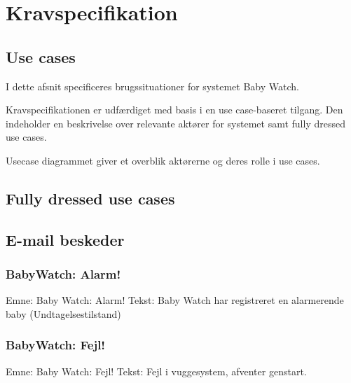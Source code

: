 \chapter{Kravspecifikation}


\section{Use cases}

I dette afsnit specificeres brugssituationer for systemet Baby Watch.

Kravspecifikationen er udfærdiget med basis i en use case-baseret tilgang. Den indeholder en beskrivelse over relevante aktører for systemet samt fully dressed use cases.


Usecase diagrammet giver et overblik aktørerne og deres rolle i use cases.


\newpage
\section{Fully dressed use cases}

\newpage

\newpage

\newpage




\section{E-mail beskeder}

\subsection*{BabyWatch: Alarm!}

Emne: Baby Watch: Alarm! \newline
Tekst: Baby Watch har registreret en alarmerende baby (Undtagelsestilstand)

\subsection*{BabyWatch: Fejl!}

Emne: Baby Watch: Fejl! \newline
Tekst: Fejl i vuggesystem, afventer genstart.



